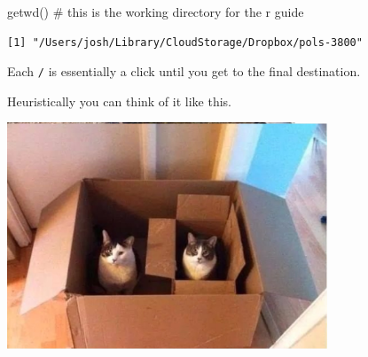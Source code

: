 \documentclass[
  letterpaper,
  DIV=11,
  numbers=noendperiod,
  oneside]{scrreprt}
\newenvironment{Shaded}{\begin{snugshade}}{\end{snugshade}}
\newcommand{\CommentTok}[1]{\textcolor[rgb]{0.37,0.37,0.37}{#1}}
\newcommand{\FunctionTok}[1]{\textcolor[rgb]{0.28,0.35,0.67}{#1}}
\newcommand{\NormalTok}[1]{\textcolor[rgb]{0.00,0.23,0.31}{#1}}
\begin{document}
\begin{Shaded}
\begin{Highlighting}[]
\FunctionTok{getwd}\NormalTok{() }\CommentTok{\# this is the working directory for the r guide}
\end{Highlighting}
\end{Shaded}

\begin{verbatim}
[1] "/Users/josh/Library/CloudStorage/Dropbox/pols-3800"
\end{verbatim}

Each \texttt{/} is essentially a click until you get to the final
destination.

Heuristically you can think of it like this.

\includegraphics[width=3.76in,height=\textheight]{figs/cats-boxes.png}
\end{document}
